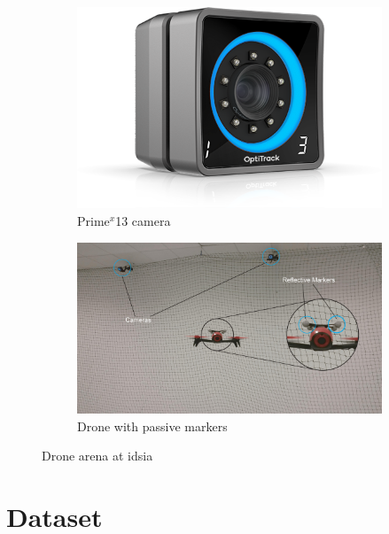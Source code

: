\begin{figure}[!htb]
	\begin{center}
		\begin{subfigure}[h]{0.34\textwidth}
			\centering
			\includegraphics[width=1\textwidth]{"contents/images/03-optitrack-camera"}
			\caption[]{Prime$^x$13 camera}
			\label{fig:optitrack-camera}
		\end{subfigure}
		\hfill
		\begin{subfigure}[h]{0.64\textwidth}
			\centering
			\includegraphics[width=1\textwidth]{"contents/images/03-arena"}
			\caption[]{Drone with passive markers \cite{mantegazza2018thesis}}
			\label{fig:drone-arena}
		\end{subfigure}
	\end{center}
	\vspace{-0.5cm}
	\caption[Drone arena at \gls{idsia}]{Drone arena at \gls{idsia}}
\end{figure}



\section{Dataset}
\label{sec:dataset}

